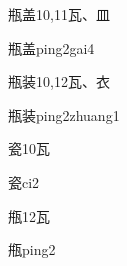 \begin{Entry}{瓶盖}{10,11}{⽡、⽫}
  \begin{Phonetics}{瓶盖}{ping2gai4}
  \end{Phonetics}
\end{Entry}

\begin{Entry}{瓶装}{10,12}{⽡、⾐}
  \begin{Phonetics}{瓶装}{ping2zhuang1}
  \end{Phonetics}
\end{Entry}

\begin{Entry}{瓷}{10}{⽡}
  \begin{Phonetics}{瓷}{ci2}
  \end{Phonetics}
\end{Entry}

\begin{Entry}{甁}{12}{⽡}
  \begin{Phonetics}{甁}{ping2}
  \end{Phonetics}
\end{Entry}


